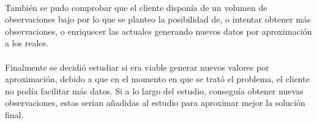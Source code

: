 \paragraph{}
También se pudo comprobar que el cliente disponía de un volumen de observaciones bajo por lo que se planteo la posibilidad de, o intentar obtener más observaciones, o enriquecer las actuales generando nuevos datos por aproximación a los reales.

\paragraph{}
Finalmente se decidió estudiar si era viable generar nuevos valores por aproximación, debido a que en el momento en que se trató el problema, el cliente no podía facilitar más datos. Si a lo largo del estudio, conseguía obtener nuevas observaciones, estas serian añadidas al estudio para aproximar mejor la solución final.





